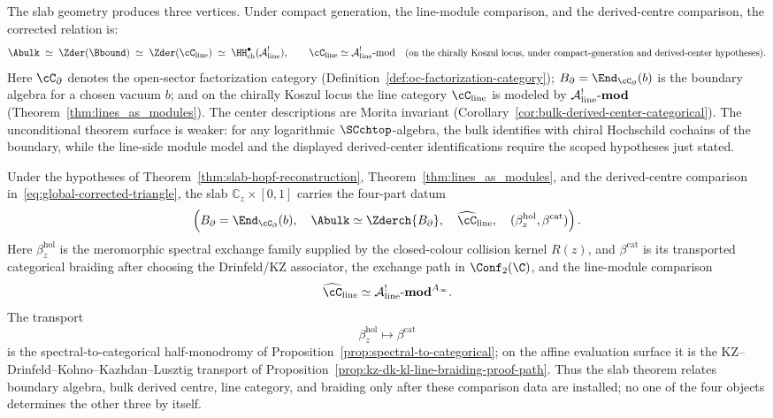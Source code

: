 The slab geometry produces three vertices. Under compact generation,
the line-module comparison, and the derived-centre comparison, the
corrected relation is:
\begin{equation}\label{eq:global-corrected-triangle}
\Abulk
\;\simeq\;
\Zder(\Bbound)
\;\simeq\;
\Zder(\cC_{\mathrm{line}})
\;\simeq\;
\HH^\bullet_{\mathrm{ch}}(\cA^!_{\mathrm{line}}),
\qquad
\cC_{\mathrm{line}}\simeq \cA^!_{\mathrm{line}}\text{-mod}
\quad
\text{\small(on the chirally Koszul locus, under compact-generation
and derived-center hypotheses)}.
\end{equation}
Here $\cC_\partial$ denotes the open-sector factorization category
(Definition~\ref{def:oc-factorization-category}); $B_\partial =
\End_{\cC_\partial}(b)$ is the boundary algebra for a chosen vacuum
$b$; and on the chirally Koszul locus
the line category $\cC_{\mathrm{line}}$ is modeled by
$\mathcal{A}^!_{\mathrm{line}}\text{-}\mathbf{mod}$
(Theorem~\ref{thm:lines_as_modules}). The center descriptions are
Morita invariant
(Corollary~\ref{cor:bulk-derived-center-categorical}). The
unconditional theorem surface is weaker: for any logarithmic
$\SCchtop$-algebra, the bulk identifies with chiral Hochschild
cochains of the boundary, while the line-side module model and the
displayed derived-center identifications require the scoped
hypotheses just stated.

\begin{corollary}
\label{cor:boundary-defect-slab-package}
Under the hypotheses of Theorem~\ref{thm:slab-hopf-reconstruction},
Theorem~\ref{thm:lines_as_modules}, and the derived-centre comparison
in~\eqref{eq:global-corrected-triangle}, the slab
\(\mathbb C_z\times[0,1]\) carries the four-part datum
\[
\left(
B_\partial=\End_{\cC_\partial}(b),\quad
\Abulk\simeq\Zderch{B_\partial},\quad
\widehat{\cC}_{\mathrm{line}},\quad
(\beta^{\mathrm{hol}}_z,\beta^{\mathrm{cat}})
\right).
\]
Here \(\beta^{\mathrm{hol}}_z\) is the meromorphic spectral exchange
family supplied by the closed-colour collision kernel \(R(z)\), and
\(\beta^{\mathrm{cat}}\) is its transported categorical braiding after
choosing the Drinfeld/KZ associator, the exchange path in
\(\Conf_2(\C)\), and the line-module comparison
\[
\widehat{\cC}_{\mathrm{line}}\simeq
\cA^!_{\mathrm{line}}\textup{-}\mathbf{mod}^{A_\infty}.
\]
The transport
\[
\beta^{\mathrm{hol}}_z\longmapsto\beta^{\mathrm{cat}}
\]
is the spectral-to-categorical half-monodromy of
Proposition~\ref{prop:spectral-to-categorical}; on the affine
evaluation surface it is the KZ--Drinfeld--Kohno--Kazhdan--Lusztig
transport of Proposition~\ref{prop:kz-dk-kl-line-braiding-proof-path}.
Thus the slab theorem relates boundary algebra, bulk derived centre,
line category, and braiding only after these comparison data are
installed; no one of the four objects determines the other three by
itself.
\end{corollary}

